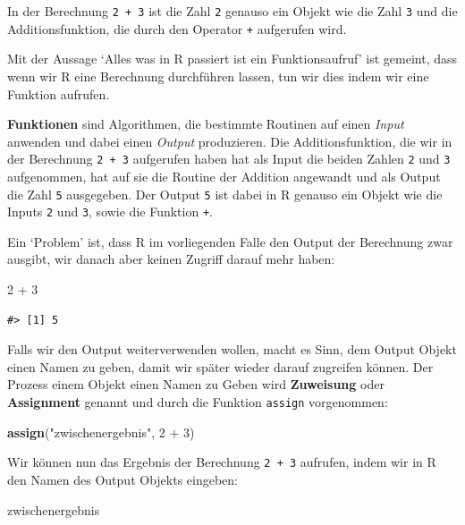 \documentclass[]{tufte-book}
\newenvironment{Shaded}{}{}
\newcommand{\KeywordTok}[1]{\textcolor[rgb]{0.00,0.44,0.13}{\textbf{#1}}}
\newcommand{\DecValTok}[1]{\textcolor[rgb]{0.25,0.63,0.44}{#1}}
\newcommand{\StringTok}[1]{\textcolor[rgb]{0.25,0.44,0.63}{#1}}
\newcommand{\OperatorTok}[1]{\textcolor[rgb]{0.40,0.40,0.40}{#1}}
\newcommand{\NormalTok}[1]{#1}
\begin{document}
In der Berechnung \texttt{2\ +\ 3} ist die Zahl \texttt{2} genauso ein
Objekt wie die Zahl \texttt{3} und die Additionsfunktion, die durch den
Operator \texttt{+} aufgerufen wird.

Mit der Aussage `Alles was in R passiert ist ein Funktionsaufruf' ist
gemeint, dass wenn wir R eine Berechnung durchführen lassen, tun wir
dies indem wir eine Funktion aufrufen.

\textbf{Funktionen} sind Algorithmen, die bestimmte Routinen auf einen
\emph{Input} anwenden und dabei einen \emph{Output} produzieren. Die
Additionsfunktion, die wir in der Berechnung \texttt{2\ +\ 3} aufgerufen
haben hat als Input die beiden Zahlen \texttt{2} und \texttt{3}
aufgenommen, hat auf sie die Routine der Addition angewandt und als
Output die Zahl \texttt{5} ausgegeben. Der Output \texttt{5} ist dabei
in R genauso ein Objekt wie die Inputs \texttt{2} und \texttt{3}, sowie
die Funktion \texttt{+}.

Ein `Problem' ist, dass R im vorliegenden Falle den Output der
Berechnung zwar ausgibt, wir danach aber keinen Zugriff darauf mehr
haben:

\begin{Shaded}
\begin{Highlighting}[]
\DecValTok{2} \OperatorTok{+}\StringTok{ }\DecValTok{3}
\end{Highlighting}
\end{Shaded}

\begin{verbatim}
#> [1] 5
\end{verbatim}

Falls wir den Output weiterverwenden wollen, macht es Sinn, dem Output
Objekt einen Namen zu geben, damit wir später wieder darauf zugreifen
können. Der Prozess einem Objekt einen Namen zu Geben wird
\textbf{Zuweisung} oder \textbf{Assignment} genannt und durch die
Funktion \texttt{assign} vorgenommen:

\begin{Shaded}
\begin{Highlighting}[]
\KeywordTok{assign}\NormalTok{(}\StringTok{"zwischenergebnis"}\NormalTok{, }\DecValTok{2} \OperatorTok{+}\StringTok{ }\DecValTok{3}\NormalTok{)}
\end{Highlighting}
\end{Shaded}

Wir können nun das Ergebnis der Berechnung \texttt{2\ +\ 3} aufrufen,
indem wir in R den Namen des Output Objekts eingeben:

\begin{Shaded}
\begin{Highlighting}[]
\NormalTok{zwischenergebnis}
\end{Highlighting}
\end{Shaded}
\end{document}
